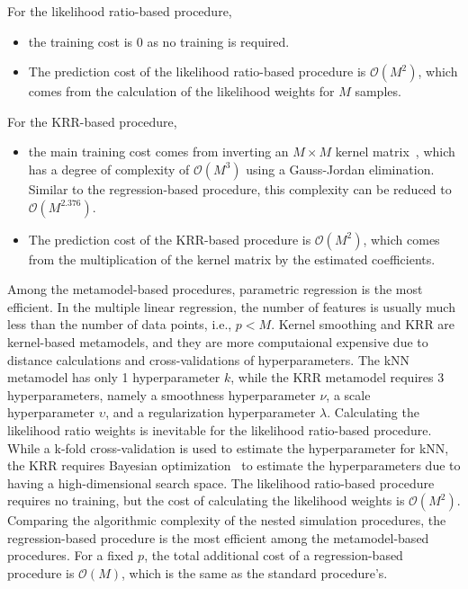 For the likelihood ratio-based procedure, 
\begin{itemize}
    \item the training cost is $0$ as no training is required.
    \item The prediction cost of the likelihood ratio-based procedure is $\mathcal{O}(M^2)$, which comes from the calculation of the likelihood weights for $M$ samples.
\end{itemize}
For the KRR-based procedure, 
\begin{itemize}
    \item the main training cost comes from inverting an $M \times M$ kernel matrix~\citep{scholkopf2002learning}, which has a degree of complexity of $\mathcal{O}(M^3)$ using a Gauss-Jordan elimination.
          Similar to the regression-based procedure, this complexity can be reduced to $\mathcal{O}(M^{2.376})$.
    \item The prediction cost of the KRR-based procedure is $\mathcal{O}(M^2)$, which comes from the multiplication of the kernel matrix by the estimated coefficients.
\end{itemize}
Among the metamodel-based procedures, parametric regression is the most efficient.
In the multiple linear regression, the number of features is usually much less than the number of data points, i.e., $p<M$. 
Kernel smoothing and KRR are kernel-based metamodels, and they are more computaional expensive due to distance calculations and cross-validations of hyperparameters. 
The kNN metamodel has only 1 hyperparameter $k$, while the KRR metamodel requires 3 hyperparameters, namely a smoothness hyperparameter $\nu$, a scale hyperparameter $\upsilon$, and a regularization hyperparameter $\lambda$.
Calculating the likelihood ratio weights is inevitable for the likelihood ratio-based procedure. 
While a k-fold cross-validation is used to estimate the hyperparameter for kNN, the KRR requires Bayesian optimization~\citep{shahriari2015taking} to estimate the hyperparameters due to having a high-dimensional search space.
The likelihood ratio-based procedure requires no training, but the cost of calculating the likelihood weights is $\mathcal{O}(M^2)$.
Comparing the algorithmic complexity of the nested simulation procedures, the regression-based procedure is the most efficient among the metamodel-based procedures.
For a fixed $p$, the total additional cost of a regression-based procedure is $\mathcal{O}(M)$, which is the same as the standard procedure's.

